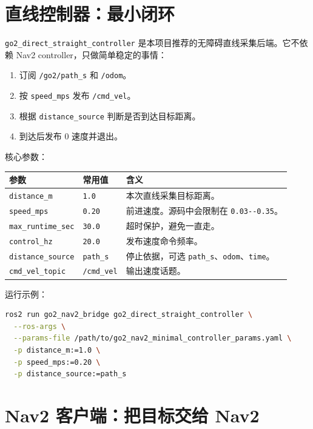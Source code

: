 \documentclass[UTF8,11pt,a4paper,openany]{ctexrep}
\newcommand{\code}[1]{\nolinkurl{#1}}
\newcommand{\topic}[1]{\nolinkurl{#1}}
\newcommand{\rosnode}[1]{\nolinkurl{#1}}
\newcommand{\param}[1]{\nolinkurl{#1}}
\begin{document}
\section{直线控制器：最小闭环}

\rosnode{go2_direct_straight_controller} 是本项目推荐的无障碍直线采集后端。它不依赖 Nav2 controller，只做简单稳定的事情：

\begin{enumerate}
  \item 订阅 \topic{/go2/path_s} 和 \topic{/odom}。
  \item 按 \param{speed_mps} 发布 \topic{/cmd_vel}。
  \item 根据 \param{distance_source} 判断是否到达目标距离。
  \item 到达后发布 0 速度并退出。
\end{enumerate}

核心参数：

\begin{longtable}{L{0.24\textwidth} L{0.18\textwidth} L{0.48\textwidth}}
\toprule
\textbf{参数} & \textbf{常用值} & \textbf{含义} \\
\midrule
\endhead
\param{distance_m} & \code{1.0} & 本次直线采集目标距离。\\
\param{speed_mps} & \code{0.20} & 前进速度。源码中会限制在 \code{0.03--0.35}。\\
\param{max_runtime_sec} & \code{30.0} & 超时保护，避免一直走。\\
\param{control_hz} & \code{20.0} & 发布速度命令频率。\\
\param{distance_source} & \code{path_s} & 停止依据，可选 \code{path_s}、\code{odom}、\code{time}。\\
\param{cmd_vel_topic} & \topic{/cmd_vel} & 输出速度话题。\\
\bottomrule
\end{longtable}

运行示例：

\begin{lstlisting}[language=bash]
ros2 run go2_nav2_bridge go2_direct_straight_controller \
  --ros-args \
  --params-file /path/to/go2_nav2_minimal_controller_params.yaml \
  -p distance_m:=1.0 \
  -p speed_mps:=0.20 \
  -p distance_source:=path_s
\end{lstlisting}

\section{Nav2 客户端：把目标交给 Nav2}
\end{document}
